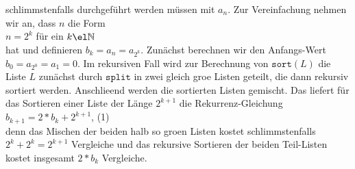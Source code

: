 schlimmstenfalls durchgef\"uhrt werden m\"ussen mit $a_n$.  Zur Vereinfachung nehmen wir an, dass $n$ die Form \\[0.1cm]
\hspace*{1.3cm} $\displaystyle n = 2^k$ \qquad f\"ur ein $k \el \mathbb{N}$ \\[0.1cm]
hat und definieren $b_k = a_n = a_{2^k}$.  Zun\"achst berechnen wir den Anfangs-Wert
$\displaystyle b_0 = a_{2^0} = a_1 = 0$.  Im rekursiven Fall wird zur Berechnung
von $\mathtt{sort}(L)$ die Liste $L$ zun\"achst durch $\texttt{split}$ in zwei
gleich gro\3e Listen geteilt, die dann rekursiv sortiert werden. Anschlie\3end
werden die sortierten Listen
gemischt.  Das liefert f\"ur das Sortieren einer Liste der L\"ange $2^{k+1}$ die Rekurrenz-Gleichung \\[0.1cm]
\hspace*{1.3cm} $b_{k+1} = 2 * b_k + 2^{k+1}$, \hspace*{\fill} (1) \\[0.1cm]
denn das Mischen der beiden halb so gro\3en Listen kostet schlimmstenfalls $2^k +
2^k = 2^{k+1}$ Vergleiche und das rekursive Sortieren 
der beiden Teil-Listen
kostet insgesamt $2*b_k$ Vergleiche.

